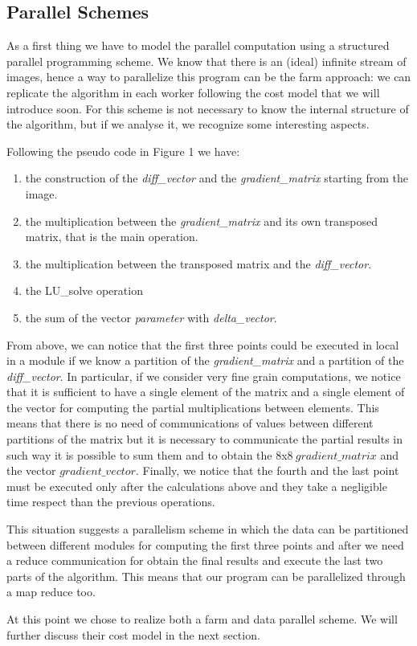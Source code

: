 \subsection{Parallel Schemes}

As a first thing we have to model the parallel computation using a structured parallel programming scheme. We know that there is an (ideal) infinite stream of images, hence a way to parallelize this program can be the farm approach: we can replicate the algorithm in each worker following the cost model that we will introduce soon. For this scheme is not necessary to know the internal structure of the algorithm, but if we analyse it, we recognize some interesting aspects.

Following the pseudo code in Figure 1 we have:
\begin{enumerate}
\item the construction of the \textit{diff\_vector} and the \textit{gradient\_matrix} starting from the image.
\item the multiplication between the \textit{gradient\_matrix} and its own transposed matrix, that is the main operation.
\item the multiplication between the transposed matrix and the \textit{diff\_vector}.
\item the LU\_solve operation
\item the sum of the vector \textit{parameter} with \textit{delta\_vector}.
\end{enumerate}

From above, we can notice that the first three points could be executed in local in a module if we know a partition of the \textit{gradient\_matrix} and a partition of the \textit{diff\_vector}. In particular, if we consider very fine grain computations, we notice that it is sufficient to have a single element of the matrix and a single element of the vector for computing the partial multiplications between elements. This means that there is no need of communications of values between different partitions of the matrix but it is necessary to communicate the partial results in such way it is possible to sum them and to obtain the $8$x$8\ gradient\_matrix$ and the vector $gradient\_vector$. Finally, we notice that the fourth and the last point must be executed only after the calculations above and they take a negligible time respect than the previous operations.

This situation suggests a parallelism scheme in which the data can be partitioned between different modules for computing the first three points and after we need a reduce communication for obtain the final results and execute the last two parts of the algorithm. This means that our program can be parallelized through a map reduce too.

At this point we chose to realize both a farm and data parallel scheme. We will further discuss their cost model in the next section.
